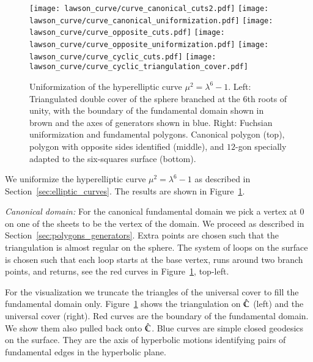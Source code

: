 \documentclass[Thesis]{subfiles}
\begin{document}
\begin{figure}
	\centering
	\resizebox{!}{6.3cm} {
	\texttt{[image: lawson\_curve/curve\_canonical\_cuts2.pdf]}
	\texttt{[image: lawson\_curve/curve\_canonical\_uniformization.pdf]}
	}
	\resizebox{!}{6.3cm} {
	\texttt{[image: lawson\_curve/curve\_opposite\_cuts.pdf]}
	\texttt{[image: lawson\_curve/curve\_opposite\_uniformization.pdf]}
	}
	\resizebox{!}{6.3cm} {
	\texttt{[image: lawson\_curve/curve\_cyclic\_cuts.pdf]}
	\texttt{[image: lawson\_curve/curve\_cyclic\_triangulation\_cover.pdf]}
	}
	\caption{Uniformization of the hyperelliptic curve
          $\mu^2=\lambda^6-1$. Left: Triangulated double cover of the
          sphere branched at the 6th roots of unity, with the boundary
          of the fundamental domain shown in brown and the axes of
          generators shown in blue. Right: Fuchsian uniformization and
          fundamental polygons. Canonical polygon (top), polygon with
          opposite sides identified (middle), and $12$-gon specially
          adapted to the six-squares surface (bottom).}
	\label{fig:lawson_curve}
\end{figure}

We uniformize the hyperelliptic curve $\mu^2=\lambda^6-1$ as described
in Section~\ref{sec:elliptic_curves}. The results are shown in Figure~\ref{fig:lawson_curve}.


 \textit{Canonical domain:}
 For the canonical fundamental domain we pick a vertex at $0$ on one of the sheets to be the vertex of the domain.
 We proceed as described in Section~\ref{sec:polygons_generators}.
Extra points are chosen such that the triangulation is almost regular on the sphere.
 The system of loops on the surface is chosen such that each loop starts at the base vertex, runs around two branch points, and returns, see the red curves in Figure~\ref{fig:lawson_curve}, top-left.

 For the visualization we truncate the triangles of the universal cover to fill the fundamental domain only.
 Figure~\ref{fig:lawson_curve} shows the triangulation on $\hat {\mathbb C}$ (left) and the universal cover (right).
 Red curves are the boundary of the fundamental domain.
 We show them also pulled back onto $\hat {\mathbb C}$. Blue curves are simple closed geodesics on the surface.
 They are the axis of hyperbolic motions identifying pairs of fundamental edges in the hyperbolic plane.
\end{document}
